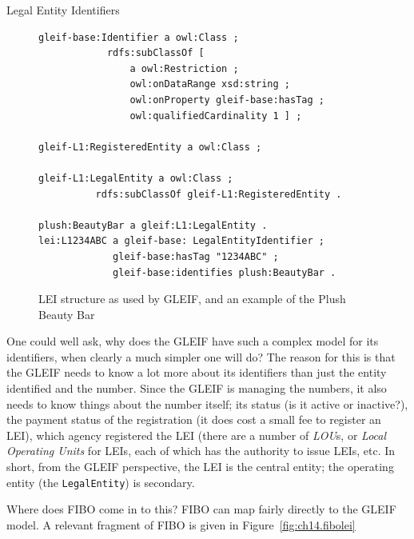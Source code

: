 \begin{challenge}{Legal Entity Identifiers}
\begin{figure}
\begin{lstlisting}
gleif-base:Identifier a owl:Class ;
            rdfs:subClassOf [
                a owl:Restriction ;
                owl:onDataRange xsd:string ;
                owl:onProperty gleif-base:hasTag ;
                owl:qualifiedCardinality 1 ] ;
                
gleif-L1:RegisteredEntity a owl:Class ;

gleif-L1:LegalEntity a owl:Class ;
          rdfs:subClassOf gleif-L1:RegisteredEntity .

plush:BeautyBar a gleif:L1:LegalEntity .
lei:L1234ABC a gleif-base: LegalEntityIdentifier ;
             gleif-base:hasTag "1234ABC" ;
             gleif-base:identifies plush:BeautyBar . 
 \end{lstlisting}
    \caption{LEI structure as used by GLEIF, and an example of the Plush Beauty Bar}
    \label{fig:ch14.gleifLEI}
\end{figure}

One could well ask, why does the GLEIF have such a complex model for its identifiers, when clearly a much simpler one will do? 
The reason for this is that the GLEIF needs to know a lot more about its identifiers than just the entity identified and the number.
Since the GLEIF is managing the numbers, it also needs to know things about the number itself; its status (is it active or inactive?), 
the payment status of the registration (it does cost a small fee to register an LEI), which agency registered the LEI (there are 
a number of \emph{LOU}s, or \emph{Local Operating Units} for LEIs, each of which has the authority to issue LEIs, etc.  In short, from the GLEIF
perspective, the LEI is the central entity; the operating entity (the \texttt{LegalEntity}) is secondary. 
\end{challenge}


Where does FIBO come in to this?    FIBO can map fairly directly to the GLEIF model.  A relevant fragment of FIBO is given in 
Figure~\ref{fig:ch14.fibolei}

